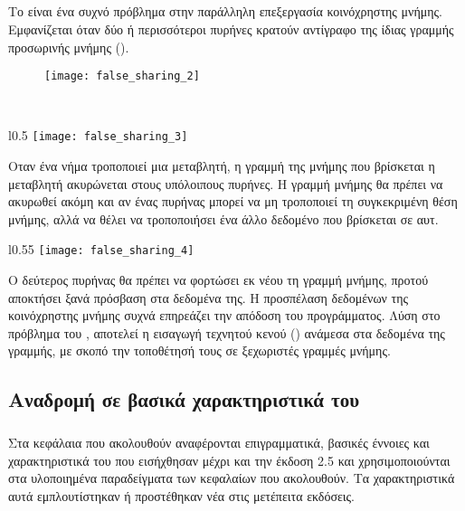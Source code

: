 \paragraph{}
\subparagraph{}
Το \emph{} είναι ένα συχνό πρόβλημα στην παράλληλη επεξεργασία κοινόχρηστης μνήμης. Εμφανίζεται όταν δύο ή περισσότεροι πυρήνες κρατούν αντίγραφο της ίδιας γραμμής προσωρινής μνήμης (\emph{}). 

\begin{figure}[h]
\texttt{[image: false\_sharing\_2]}
\centering
\captionsetup{justification=centering, singlelinecheck=false}
	\caption{}
\label{fig:false_sharing_2}
\end{figure}

\ \\
\begin{wrapfigure}{l}{0.5\textwidth}
	\centering
	\texttt{[image: false\_sharing\_3]}
	\captionsetup{justification=centering, singlelinecheck=false}
	\caption{}
\label{fig:false_sharing_3}
\end{wrapfigure}

Οταν ένα νήμα τροποποιεί μια μεταβλητή, η γραμμή της μνήμης που βρίσκεται η μεταβλητή ακυρώνεται στους υπόλοιπους πυρήνες. Η γραμμή μνήμης θα πρέπει να ακυρωθεί ακόμη και αν ένας πυρήνας μπορεί να μη τροποποιεί τη συγκεκριμένη θέση μνήμης, αλλά να θέλει να τροποποιήσει ένα άλλο δεδομένο που βρίσκεται σε αυτ. 

\clearpage
\begin{wrapfigure}{l}{0.55\textwidth}
	\centering
	\texttt{[image: false\_sharing\_4]}
	\captionsetup{justification=centering, singlelinecheck=false}
	\caption{}
\label{fig:false_sharing_4}
\end{wrapfigure}

Ο δεύτερος πυρήνας θα πρέπει να φορτώσει εκ νέου τη γραμμή μνήμης, προτού αποκτήσει ξανά πρόσβαση στα δεδομένα της. Η προσπέλαση δεδομένων της κοινόχρηστης μνήμης συχνά επηρεάζει την απόδοση του προγράμματος\cite{false_sharing}.
Λύση στο πρόβλημα του , αποτελεί η εισαγωγή τεχνητού κενού () ανάμεσα στα δεδομένα της γραμμής, με σκοπό την τοποθέτησή τους σε ξεχωριστές γραμμές μνήμης.
\clearpage
\subsection{Αναδρομή σε βασικά χαρακτηριστικά του \emph{}}
\subparagraph{}
Στα κεφάλαια που ακολουθούν αναφέρονται επιγραμματικά, βασικές έννοιες και χαρακτηριστικά του \emph{} που εισήχθησαν μέχρι και την έκδοση 2.5 και χρησιμοποιούνται στα υλοποιημένα παραδείγματα των κεφαλαίων που ακολουθούν. Τα χαρακτηριστικά αυτά εμπλουτίστηκαν ή προστέθηκαν νέα στις μετέπειτα εκδόσεις.

